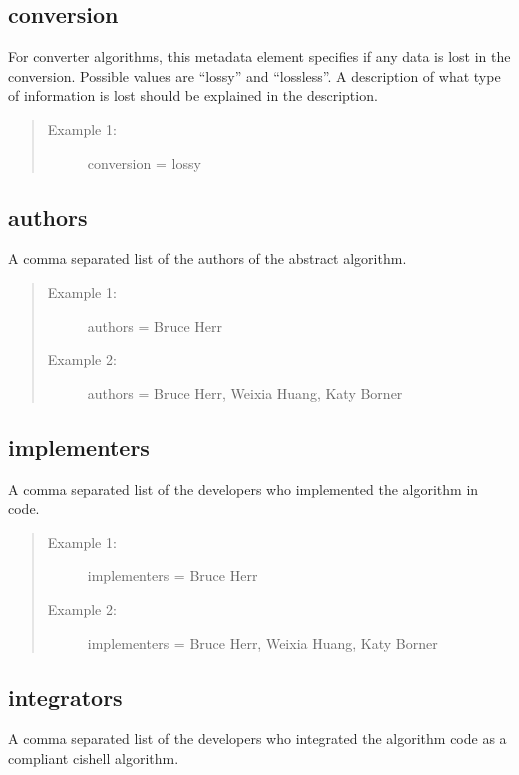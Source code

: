 \subsection*{conversion}
For converter algorithms, this metadata element specifies if any data is
lost in the conversion. Possible values are ``lossy'' and ``lossless''. A
description of what type of information is lost should be explained in the
description.

\begin{quote}
\begin{description}
  \item[Example 1:] conversion = lossy 
\end{description}
\end{quote}


\subsection*{authors}
A comma separated list of the authors of the abstract algorithm.

\begin{quote}
\begin{description}
  \item[Example 1:] authors = Bruce Herr
  \item[Example 2:] authors = Bruce Herr, Weixia Huang, Katy Borner 
\end{description}
\end{quote}


\subsection*{implementers}
A comma separated list of the developers who implemented the algorithm in code.

\begin{quote}
\begin{description}
  \item[Example 1:] implementers = Bruce Herr
  \item[Example 2:] implementers = Bruce Herr, Weixia Huang, Katy Borner 
\end{description}
\end{quote}


\subsection*{integrators}
A comma separated list of the developers who integrated the algorithm code as
a compliant cishell algorithm.

